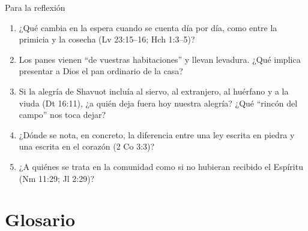 \documentclass[hyperref={bookmarks=false},aspectratio=169]{beamer}
\begin{document}
\begin{frame}{Para la reflexión}
\small
\begin{enumerate}
\item ¿Qué cambia en la espera cuando se cuenta día por día, como entre la primicia y la cosecha (Lv 23:15--16; Hch 1:3--5)?
\item Los panes vienen ``de vuestras habitaciones'' y llevan levadura. ¿Qué implica presentar a Dios el pan ordinario de la casa?
\item Si la alegría de Shavuot incluía al siervo, al extranjero, al huérfano y a la viuda (Dt 16:11), ¿a quién deja fuera hoy nuestra alegría? ¿Qué ``rincón del campo'' nos toca dejar?
\item ¿Dónde se nota, en concreto, la diferencia entre una ley escrita en piedra y una escrita en el corazón (2 Co 3:3)?
\item ¿A quiénes se trata en la comunidad como si no hubieran recibido el Espíritu (Nm 11:29; Jl 2:29)?
\end{enumerate}
\end{frame}

\section{Glosario}
\end{document}
